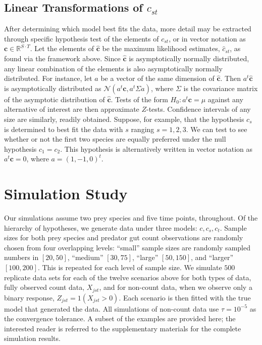 \documentclass[12pt]{article}
\begin{document}
\subsection{Linear Transformations of $c_{st}$}

After determining which model best fits the data, more detail may be extracted through specific hypothesis test of the elements of $c_{st}$, or in vector notation as $\mathbf{c} \in \mathbb{R}^{S\cdot T}$.  Let the elements of $\hat{\mathbf{c}}$ be the maximum likelihood estimates, $\hat{c}_{st}$, as found via the framework above.  Since $\hat{\mathbf{c}}$ is asymptotically normally distributed, any linear combination of the elements is also asymptotically normally distributed.  For instance, let $a$ be a vector of the same dimension of $\hat{\mathbf{c}}$.  Then $a^t\hat{\mathbf{c}}$ is asymptotically distributed as $\mathcal{N}(a^t\mathbf{c}, a^t\Sigma a)$, where $\Sigma$ is the covariance matrix of the asymptotic distribution of $\hat{\mathbf{c}}$.  Tests of the form $H_0: a^t\mathbf{c} = \mu$ against any alternative of interest are then approximate $Z$-tests.  Confidence intervals of any size are similarly, readily obtained.  Suppose, for example, that the hypothesis $c_s$ is determined to best fit the data with $s$ ranging $s = 1, 2, 3$.  We can test to see whether or not the first two species are equally preferred under the null hypothesis $c_{1} = c_{2}$.  This hypothesis is alternatively written in vector notation as $a^t\mathbf{c} = 0$, where $a = (1, -1, 0)^t$.  

\section{Simulation Study}
\label{sec:sim}

Our simulations assume two prey species and five time points, throughout.  Of the hierarchy of hypotheses, we generate data under three models: $c, c_s, c_t$.  Sample sizes for both prey species and predator gut count observations are randomly chosen from four overlapping levels: ``small'' sample sizes are randomly sampled numbers in $[20,50]$, ``medium'' $[30,75]$, ``large'' $[50,150]$, and ``larger'' $[100,200]$.  This is repeated for each level of sample size.  We simulate $500$ replicate data sets for each of the twelve scenarios above for both types of data, fully observed count data, $X_{jst}$, and for non-count data, when we observe only a binary response, $Z_{jst} = 1(X_{jst}>0)$.  Each scenario is then fitted with the true model that generated the data.  All simulations of non-count data use $\tau = 10^{-5}$ as the convergence tolerance.  A subset of the examples are provided here; the interested reader is referred to the supplementary materials for the complete simulation results.
\end{document}
